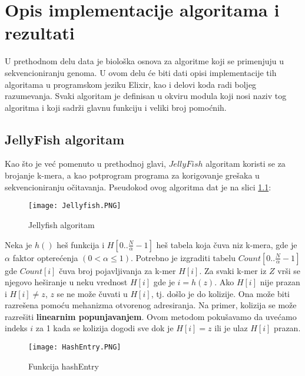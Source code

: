 \documentclass[12pt,oneside]{memoir}
\begin{document}
\chapter{Opis implementacije algoritama i rezultati}

U prethodnom delu data je biološka osnova za algoritme koji se primenjuju u sekvencioniranju genoma. U ovom delu će biti dati opisi implementacije tih algoritama u programskom jeziku Elixir, kao i delovi koda radi boljeg razumevanja. Svaki algoritam je definisan u okviru modula koji nosi naziv tog algoritma i koji sadrži glavnu funkciju i veliki broj pomoćnih.

\newpage

\section{JellyFish algoritam}

Kao što je već pomenuto u prethodnoj glavi, $JellyFish$ algoritam koristi se za brojanje k-mera, a kao potprogram programa za korigovanje grešaka u sekvencioniranju očitavanja.
Pseudokod ovog algoritma dat je na slici \ref{fig:jellyfish}:

\begin{figure}[!ht]
  \centering
  \texttt{[image: Jellyfish.PNG]}
  \caption{Jellyfish algoritam}
  \label{fig:jellyfish}
\end{figure}

Neka je $h()$ heš funkcija i $H[0..\frac{N}{\alpha} - 1]$ heš tabela koja čuva niz k-mera, gde je $\alpha$ faktor opterećenja $(0 < \alpha \leq 1)$. Potrebno je izgraditi tabelu $Count[0..\frac{N}{\alpha} - 1]$ gde $Count[i]$ čuva broj pojavljivanja za k-mer $H[i]$. Za svaki k-mer iz $Z$ vrši se njegovo  heširanje u neku vrednost $H[i]$ gde je $i = h(z)$. Ako $H[i]$ nije prazan i $H[i] \neq z$, $z$ se ne može čuvati u $H[i]$, tj. došlo je do kolizije. Ona može biti razrešena pomoću mehanizma otvorenog adresiranja. Na primer, kolizija se može razrešiti \textbf{linearnim popunjavanjem}. Ovom metodom pokušavamo da uvećamo indeks $i$ za 1 kada se kolizija dogodi sve dok je $H[i] = z$ ili je ulaz $H[i]$ prazan. 


\begin{figure}[!ht]
  \centering
  \texttt{[image: HashEntry.PNG]}
  \caption{Funkcija hashEntry}
  \label{fig:6}
\end{figure}
\end{document}

